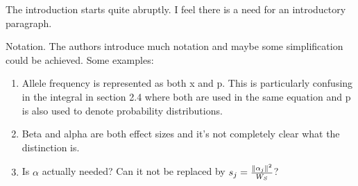 

\begin{point}{} %
The introduction starts quite abruptly. I feel there is a need for an introductory
paragraph.
\end{point}


\begin{point}{} %
Notation. The authors introduce much notation and maybe some simplification could be
achieved. Some examples:
\begin{enumerate}
    \item[(a)] Allele frequency is represented as both x and p. This is particularly confusing in
the integral in section 2.4 where both are used in the same equation and p is also
used to denote probability distributions.
    \item[(b)] Beta and alpha are both effect sizes and it’s not completely clear what the
distinction is.
    \item[(c)] Is $\alpha$ actually needed? Can it not be replaced by $s_j = \frac{\left\| \alpha_j \right\|^2}{W_S}$?
\end{enumerate}
\end{point}


